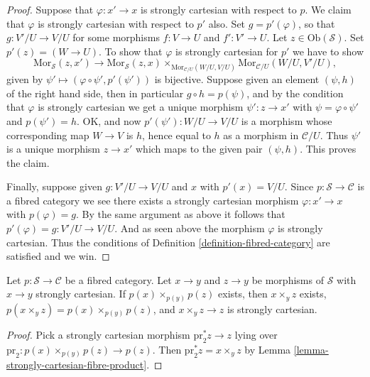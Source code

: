 \begin{proof}
Suppose that $\varphi : x' \to x$ is strongly cartesian with respect to $p$.
We claim that $\varphi$ is strongly cartesian with respect to $p'$ also.
Set $g = p'(\varphi)$, so that $g : V'/U \to V/U$
for some morphisms $f : V \to U$ and $f' : V' \to U$.
Let $z \in \text{Ob}(\mathcal{S})$. Set $p'(z) = (W \to U)$.
To show that $\varphi$ is strongly cartesian for $p'$ we have to show
$$
\text{Mor}_{\mathcal{S}}(z, x')
\longrightarrow
\text{Mor}_{\mathcal{S}}(z, x)
\times_{\text{Mor}_{\mathcal{C}/U}(W/U, V/U)}
\text{Mor}_{\mathcal{C}/U}(W/U, V'/U),
$$
given by $\psi' \longmapsto (\varphi \circ \psi', p'(\psi'))$
is bijective. Suppose given an element $(\psi, h)$ of the
right hand side, then in particular $g \circ h = p(\psi)$,
and by the condition that $\varphi$ is strongly cartesian we
get a unique morphism $\psi' : z \to x'$ with $\psi = \varphi \circ \psi'$
and $p(\psi') = h$. OK, and now $p'(\psi') : W/U \to V/U$
is a morphism whose corresponding map $W \to V$ is $h$, hence
equal to $h$ as a morphism in $\mathcal{C}/U$. Thus $\psi'$ is
a unique morphism $z \to x'$ which maps to the given pair $(\psi, h)$. 
This proves the claim.

\medskip\noindent
Finally, suppose given $g : V'/U \to V/U$ and $x$ with $p'(x) = V/U$.
Since $p : \mathcal{S} \to \mathcal{C}$ is a fibred category we
see there exists a strongly cartesian morphism $\varphi : x' \to x$
with $p(\varphi) = g$. By the same argument as above it follows
that $p'(\varphi) = g : V'/U \to V/U$. And as seen above the morphism
$\varphi$ is strongly cartesian. Thus the conditions of
Definition \ref{definition-fibred-category} are satisfied and we win.
\end{proof}

\begin{lemma}
\label{lemma-fibred-category-representable-goes-up}
Let $p : \mathcal{S} \to \mathcal{C}$ be a fibred category.
Let $x \to y$ and $z \to y$ be morphisms of $\mathcal{S}$
with $x \to y$ strongly cartesian. If $p(x) \times_{p(y)} p(z)$ exists,
then $x \times_y z$ exists, $p(x \times_y z) = p(x) \times_{p(y)} p(z)$,
and $x \times_y z \to z$ is strongly cartesian.
\end{lemma}

\begin{proof}
Pick a strongly cartesian morphism
$\text{pr}_2^*z \to z$ lying over
$\text{pr}_2 : p(x) \times_{p(y)} p(z) \to p(z)$. Then
$\text{pr}_2^*z = x \times_y z$ by
Lemma \ref{lemma-strongly-cartesian-fibre-product}.
\end{proof}





